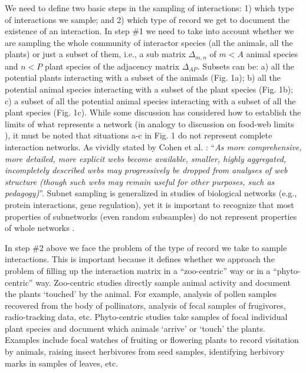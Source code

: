 \documentclass[12pt]{article}
\begin{document}
We need to define two basic steps in the sampling of interactions: 1) which type of interactions we sample; and 2) which type of record we get to document the existence of an interaction. In step \#1 we need to take into account whether we are sampling the whole community of interactor species (all the animals, all the plants) or just a subset of them, i.e., a sub matrix $\Delta_{m,n}$ of $m < A$ animal species and $n <  P$ plant species of the adjacency matrix $\Delta_{AP}$. Subsets can be: a) all the potential plants interacting with a subset of the animals (Fig. 1a); b) all the potential animal species interacting with a subset of the plant species (Fig. 1b); c) a subset of all the potential animal species interacting with a subset of all the plant species (Fig. 1c). While some discussion has considered how to establish the limits of what represents a network \citep{Strogatz:2001wc} (in analogy to discussion on food-web limits \citep{Cohen:1978}), it must be noted that situations a-c in Fig. 1 do not represent complete interaction networks. As vividly stated by Cohen et al. \citeyearpar{Cohen:1993aa}: ``\emph{As more comprehensive, more detailed, more explicit webs become available, smaller, highly aggregated, incompletely described webs may progressively be dropped from analyses of web structure (though such webs may remain useful for other purposes, such as pedagogy)}''. Subnet sampling is generalized in studies of biological networks (e.g., protein interactions, gene regulation), yet it is important to recognize that most properties of subnetworks (even random subsamples) do not represent properties of whole networks \citep{Stumpf:2005tn}. 


In step \#2 above we face the problem of the type of record we take to sample interactions. This is important because it defines whether we approach the problem of filling up the interaction matrix in a ``zoo-centric'' way or in a ``phyto-centric'' way. Zoo-centric studies directly sample animal activity and document the plants `touched' by the animal. For example, analysis of pollen samples recovered from the body of pollinators, analysis of fecal samples of frugivores, radio-tracking data, etc. Phyto-centric studies take samples of focal individual plant species and document which animals `arrive' or `touch' the plants. Examples include focal watches of fruiting or flowering plants to record visitation by animals, raising insect herbivores from seed samples, identifying herbivory marks in samples of leaves, etc. 
\end{document}
